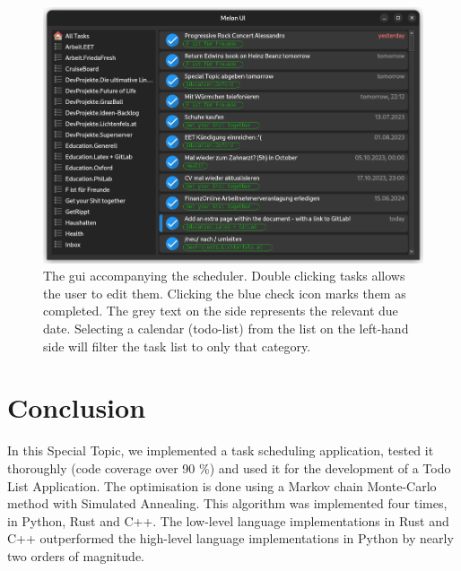\documentclass{prettytex/ox/mmsc-special-topic}
\title{\topictitle}
\author{Candidate \candidatenumber}
\date{\today}
\begin{document}
  \pagestyle{plain}
  \mmscSpecialHeader

  \begin{abstract}
    \label{abstract}
    In this project report we will implement a task scheduling method on the basis of a \gls{mcmc} method with Simulated Annealing. The project is available as a software package \textbf{melon-scheduler} on PyPi.


    The algorithm is implemented four times, twice in Python, once in Rust and also in C++.
    Python module bindings to these low-level language implementations are provided using \texttt{rust-cpython} and \texttt{pybind11}, respectively.
  \end{abstract}

  \begin{figure}[H]
    \centering
    \includegraphics[width=0.85\linewidth]{figures/melon-ui.png}
    \caption{The \gls{gui} accompanying the scheduler. Double clicking tasks allows the user to edit them. Clicking the blue check icon marks them as completed. The grey text on the side represents the relevant due date. Selecting a calendar (todo-list) from the list on the left-hand side will filter the task list to only that category.}
    \label{fig:gui}
  \end{figure}

  \pagebreak
  \pagestyle{normal}


  
  
  
  
  
  

  \section{Conclusion}
  In this Special Topic, we implemented a task scheduling application, tested it thoroughly (code coverage over 90 \%) and used it for the development of a Todo List Application.
  The optimisation is done using a Markov chain Monte-Carlo method with Simulated Annealing.
  This algorithm was implemented four times, in Python, Rust and C++.
  The low-level language implementations in Rust and C++ outperformed the high-level language implementations in Python by nearly two orders of magnitude.
\end{document}

